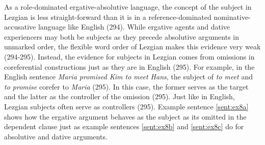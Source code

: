 As a role-dominated ergative-absolutive language, the concept of the subject in Lezgian is less straight-forward than it is in a reference-dominated nominative-accusative language like English (294). While ergative agents and dative experiencers may both be subjects as they precede absolutive arguments in unmarked order, the flexible word order of Lezgian makes this evidence very weak (294-295). Instead, the evidence for subjects in Lezgian comes from omissions in coreferential constructions just as they are in English (295). For example, in the English sentence \textit{Maria promised Kim to meet Hans}, the subject of \textit{to meet} and \textit{to promise} corefer to \textit{Maria} (295). In this case, the former serves as the target and the latter as the controller of the omission (295). Just like in English, Lezgian subjects often serve as controllers (295). Example sentence \ref{sent:ex8a} shows how the ergative argument behaves as the subject as its omitted in the dependent clause just as example sentences \ref{sent:ex8b} and \ref{sent:ex8c} do for absolutive and dative arguments.